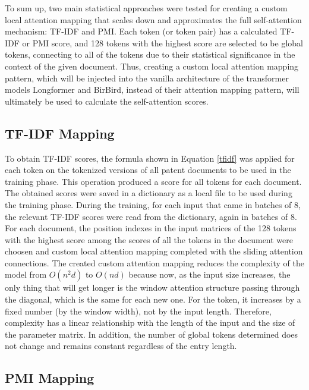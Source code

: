 \documentclass{iyte}
\begin{document}
To sum up, two main statistical approaches were tested for creating a custom local attention mapping that scales down and approximates the full self-attention mechanism: TF-IDF and PMI. Each token (or token pair) has a calculated TF-IDF or PMI score, and 128 tokens with the highest score are selected to be global tokens, connecting to all of the tokens due to their statistical significance in the context of the given document. Thus, creating a custom local attention mapping pattern, which will be injected into the vanilla architecture of the transformer models Longformer and BirBird, instead of their attention mapping pattern, will ultimately be used to calculate the self-attention scores.

\subsection{TF-IDF Mapping}

To obtain TF-IDF scores, the formula shown in Equation \ref{tfidf} was applied for each token on the tokenized versions of all patent documents to be used in the training phase. This operation produced a score for all tokens for each document. The obtained scores were saved in a dictionary as a local file to be used during the training phase. During the training, for each input that came in batches of 8, the relevant TF-IDF scores were read from the dictionary, again in batches of 8. For each document, the position indexes in the input matrices of the 128 tokens with the highest score among the scores of all the tokens in the document were choosen and custom local attention mapping completed with the sliding attention connections. The created custom attention mapping reduces the complexity of the model from \(O(n^2d)\) to \(O(nd)\) because now, as the input size increases, the only thing that will get longer is the window attention structure passing through the diagonal, which is the same for each new one. For the token, it increases by a fixed number (by the window width), not by the input length. Therefore, complexity has a linear relationship with the length of the input and the size of the parameter matrix. In addition, the number of global tokens determined does not change and remains constant regardless of the entry length.

\subsection{PMI Mapping}
\end{document}
